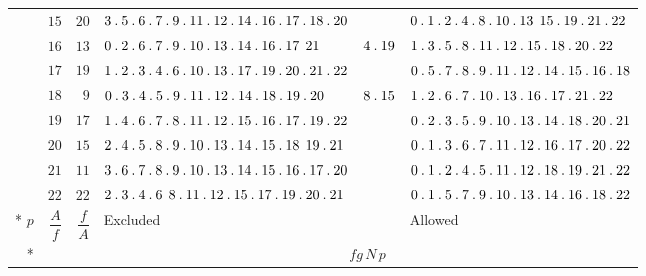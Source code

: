 \begin{longtable}{r|r|r|p{125pt}|p{28pt}|p{125pt}}
 & $15$ & $20$ & $3\pdot 5\pdot 6\pdot 7\pdot 9\pdot 11\pdot 12\pdot 14\pdot 16\pdot 17\pdot 18\pdot 20$ &  & $0\pdot 1\pdot 2\pdot 4\pdot 8\pdot 10\pdot 13\mspace{8mu}15\pdot 19\pdot 21\pdot 22$\\
 & $16$ & $13$ & $0\pdot 2\pdot 6\pdot 7\pdot 9\pdot 10\pdot 13\pdot 14\pdot 16\pdot 17\mspace{8mu}21$ & $4\pdot 19$ & $1\pdot 3\pdot 5\pdot 8\pdot 11\pdot 12\pdot 15\pdot 18\pdot 20\pdot 22$\\
 & $17$ & $19$ & $1\pdot 2\pdot 3\pdot 4\pdot 6\pdot 10\pdot 13\pdot 17\pdot 19\pdot 20\pdot 21\pdot 22$ &  & $0\pdot 5\pdot 7\pdot 8\pdot 9\pdot 11\pdot 12\pdot 14\pdot 15\pdot 16\pdot 18$\\
 & $18$ & $9$ & $0\pdot 3\pdot 4\pdot 5\pdot 9\pdot 11\pdot 12\pdot 14\pdot 18\pdot 19\pdot 20$ & $8\pdot 15$ & $1\pdot 2\pdot 6\pdot 7\pdot 10\pdot 13\pdot 16\pdot 17\pdot 21\pdot 22$\\
 & $19$ & $17$ & $1\pdot 4\pdot 6\pdot 7\pdot 8\pdot 11\pdot 12\pdot 15\pdot 16\pdot 17\pdot 19\pdot 22$ &  & $0\pdot 2\pdot 3\pdot 5\pdot 9\pdot 10\pdot 13\pdot 14\pdot 18\pdot 20\pdot 21$\\
 & $20$ & $15$ & $2\pdot 4\pdot 5\pdot 8\pdot 9\pdot 10\pdot 13\pdot 14\pdot 15\pdot 18\mspace{8mu}19\pdot 21$ &  & $0\pdot 1\pdot 3\pdot 6\pdot 7\pdot 11\pdot 12\pdot 16\pdot 17\pdot 20\pdot 22$\\
 & $21$ & $11$ & $3\pdot 6\pdot 7\pdot 8\pdot 9\pdot 10\pdot 13\pdot 14\pdot 15\pdot 16\pdot 17\pdot 20$ &  & $0\pdot 1\pdot 2\pdot 4\pdot 5\pdot 11\pdot 12\pdot 18\pdot 19\pdot 21\pdot 22$\\
 & $22$ & $22$ & $2\pdot 3\pdot 4\pdot 6\mspace{8mu}8\pdot 11\pdot 12\pdot 15\pdot 17\pdot 19\pdot 20\pdot 21$ &  & $0\pdot 1\pdot 5\pdot 7\pdot 9\pdot 10\pdot 13\pdot 14\pdot 16\pdot 18\pdot 22$\\*
\hline
$p$ & $\dfrac{A}{f}$ & $\dfrac{f}{A}$ & Excluded & & Allowed\\*\cline{4-4}\cline{6-6}
& & & \multicolumn{3}{c}{$fg\,N\,p$}\\
\end{longtable}\endgroup
